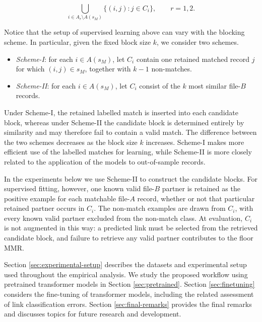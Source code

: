 \[
\bigcup_{i\in A_r\setminus A(s_M)}
\{(i,j):j\in C_i\},
\qquad r=1,2.
\]

Notice that the setup of supervised learning above can vary with the blocking scheme. In particular, given the fixed block size $k$, we consider two schemes.

\begin{itemize}[leftmargin=2mm,itemsep=0pt]

\item[] \emph{Scheme-I}: for each $i \in A(s_M)$, let $C_i$ contain one retained matched record $j$ for which $(i,j) \in s_M$, together with $k-1$ non-matches.

\item[] \emph{Scheme-II}: for each $i \in A(s_M)$, let $C_i$ consist of the $k$ most similar file-$B$ records.

\end{itemize}

Under Scheme-I, the retained labelled match is inserted into each candidate block, whereas under
Scheme-II the candidate block is determined entirely by similarity and may therefore fail
to contain a valid match. The difference between the two schemes decreases as the block
size $k$ increases. Scheme-I makes more efficient use of the labelled matches for learning,
while Scheme-II is more closely related to the application of the models to out-of-sample
records.

In the experiments below we use Scheme-II to construct the candidate blocks. For supervised
fitting, however, one known valid file-$B$ partner is retained as the positive example for each
matchable file-$A$ record, whether or not that particular retained partner occurs in $C_i$.
The non-match examples are drawn from $C_i$, with every known valid partner excluded from
the non-match class. At evaluation, $C_i$ is not augmented in this way: a predicted link must
be selected from the retrieved candidate block, and failure to retrieve any valid partner
contributes to the floor MMR.

Section \ref{sec:experimental-setup} describes the datasets and experimental setup used throughout the empirical analysis. We study the proposed workflow using pretrained transformer models in Section \ref{sec:pretrained}. Section \ref{sec:finetuning} considers the fine-tuning of transformer models, including the related assessment of link classification errors. Section \ref{sec:final-remarks} provides the final remarks and discusses topics for future research and development.


